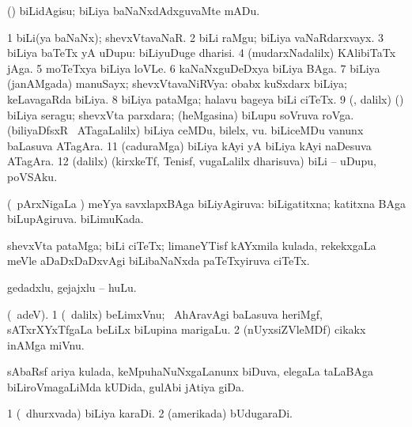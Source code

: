 \bentry
{} 
\gl{\sakirx}
\expl{}
\bmng
(\pArxparx) biLidAgisu; biLiya baNaNxdAdxguvaMte mADu. 
\emng
\eentry

\bentry
{} 
\gl{\nA}
\expl{}
\bmng
\bnum
\num{1} biLi(ya baNaNx); shevxVtavaNaR. 
\num{2} biLi raMgu; biLiya vaNaRdarxvayx. 
\num{3} biLiya baTeTx yA uDupu:  biLiyuDuge dharisi. 
\num{4} (mudarxNadalilx) KAlibiTaTx jAga. 
\num{5} moTeTxya biLiya loVLe. 
\num{6} kaNaNxguDeDxya biLiya BAga. 
\num{7}  biLiya (janAMgada) manuSayx; shevxVtavaNiRVya:  obabx kuSxdarx biLiya; keLavagaRda biLiya. 
\num{8} biLiya pataMga; halavu bageya biLi ciTeTx. 
\num{9} (\AmA, \bava dalilx) (\veYshA) biLiya seragu; shevxVta parxdara; (heMgasina) biLupu soVruva roVga. 
 (biliyaDfsxR \mo\ ATagaLalilx) 
\banum
{} biLiya ceMDu, bilelx, \mo vu. 
 biLiceMDu \mo vanunx baLasuva ATagAra. 
\eanum
\numie
\num{11} (caduraMga) biLiya kAyi yA biLiya kAyi naDesuva ATagAra. 
\num{12} (\bava dalilx) (kirxkeTf, Tenisf, \mo vugaLalilx dharisuva) biLi -- uDupu, poVSAku. 
\enum
\emng
\eentry

\bentry
{} 
\gl{\sapUpa}
\expl{}
\bmng
(\kanmu\ pArxNigaLa \vi) meYya savxlapxBAga biLiyAgiruva:  biLigatitxna; katitxna BAga biLupAgiruva.  biLimuKada. 
\emng
\eentry

\bentry
{} 
\gl{\nA}
\expl{}
\bmng
shevxVta pataMga; biLi ciTeTx; limaneYTisf kAYxmila kulada, rekekxgaLa meVle aDaDxDaDxvAgi biLibaNaNxda paTeTxyiruva ciTeTx. 
\emng
\eentry

\bentry
{}
\gl{\nA}
\bmng
gedadxlu, gejajxlu -- huLu. 
\emng
\eentry

\bentry
{}
\gl{\nA}
\bmng
(\bava\ adeV). 
\bnum
\num{1} (\sA\ \bava dalilx) beLimxVnu; \kanmu\ AhAravAgi baLasuva heriMgf, sATxrXYxTfgaLa beLiLx biLupina marigaLu. 
\num{2} (nUyxsiZVleMDf) cikakx inAMga  miVnu. 
\enum
\emng
\eentry

\bentry
{} 
\gl{\nA}
\expl{}
\bmng
sAbaRsf ariya kulada, keMpuhaNuNxgaLanunx biDuva, elegaLa taLaBAga biLiroVmagaLiMda kUDida, gulAbi jAtiya giDa. 
\emng
\eentry

\bentry
{} 
\gl{\nA}
\expl{}
\bmng
\bnum
\num{1} (\kanu\ dhurxvada) biLiya karaDi. 
\num{2} (amerikada) bUdugaraDi. 
\enum
\emng
\eentry

